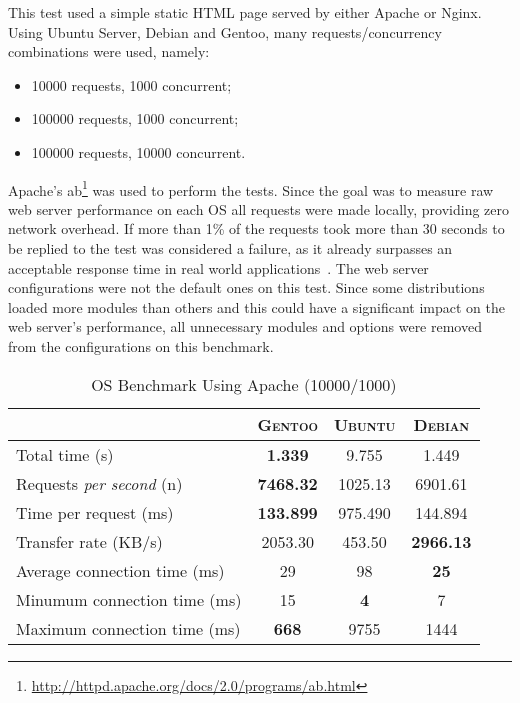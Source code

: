 This test used a simple static HTML page served by either Apache or Nginx. Using Ubuntu Server, Debian and Gentoo, many requests/concurrency combinations were used, namely:
\begin{itemize}
  \item 10000 requests, 1000 concurrent;
  \item 100000 requests, 1000 concurrent;
  \item 100000 requests, 10000 concurrent.
\end{itemize}
Apache's ab\footnote{\url{http://httpd.apache.org/docs/2.0/programs/ab.html}} was used to perform the tests. Since the goal was to measure raw web server performance on each OS all requests were made locally, providing zero network overhead. If more than 1\% of the requests took more than 30 seconds to be replied to the test was considered a failure, as it already surpasses an acceptable response time in real world applications~\cite{usability_engineering}. The web server configurations were not the default ones on this test. Since some distributions loaded more modules than others and this could have a significant impact on the web server's performance, all unnecessary modules and options were removed from the configurations on this benchmark.
\begin{table}[h!t]
  \centering
  \caption{OS Benchmark Using Apache (10000/1000)}
  \label{tab:os_apache_10000_1000}
  
  \begin{tabular}{l|c|c|c}
    & \textbf{\textsc{Gentoo}} & \textbf{\textsc{Ubuntu}} & \textbf{\textsc{Debian}} \\ \hline
    Total time (s) & \textbf{1.339} & 9.755 & 1.449 \\ \hline
    Requests \textit{per second} (n) & \textbf{7468.32} & 1025.13 & 6901.61 \\ \hline
    Time per request (ms) & \textbf{133.899} & 975.490 & 144.894 \\ \hline
    Transfer rate (KB/s) & 2053.30 & 453.50 & \textbf{2966.13} \\ \hline
    Average connection time (ms) & 29 & 98 & \textbf{25} \\ \hline
    Minumum connection time (ms) & 15 & \textbf{4} & 7 \\ \hline
    Maximum connection time (ms) & \textbf{668} & 9755 & 1444 \\
  \end{tabular}
\end{table}

